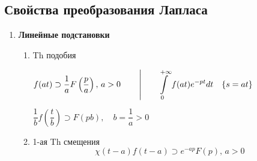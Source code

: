 \documentclass[oneside, final, 12pt]{article}
\def\lftKul{\supset}
\theoremstyle{def}
\begin{document}
	\subsection{Свойства преобразования Лапласа}
	\renewcommand{\labelenumi}{\fbox{ \large\Roman{enumi} }}
	\renewcommand{\labelenumii}{\arabic{enumii}.}
	\begin{enumerate}
		\item \textbf{Линейные подстановки}
			 \begin{enumerate}
			 	\item Th подобия \vspace{4mm} \newline
			 		\begin{minipage}{0.4\textwidth}	
			 			$
			 				\begin{gathered}
		 						f(at) \lftKul \dfrac{1}{a}F\left(\dfrac{p}{a}\right),\,  a>0  \qquad \vspace{3mm} \left| 
		 						 \qquad \int\limits_{0}^{+\infty} f(at) e^{-pt}dt  \quad \{s=at\}
		 						\vspace{3mm}\right.
		 					\end{gathered}
						$
						$
							\dfrac{1}{b} f\left(\dfrac{t}{b}\right) \lftKul F(pb), \quad b = \dfrac{1}{a}> 0
						$
			 		\end{minipage} \vspace{5mm}
			 	\item 1-ая Th смещения \vspace{1mm} \newline
			 		$$
			 			\chi(t-a)f(t-a)  \lftKul e^{-ap}F(p),\,  a>0
			 		$$
			 		

\end{enumerate}
\end{enumerate}
\end{document}
